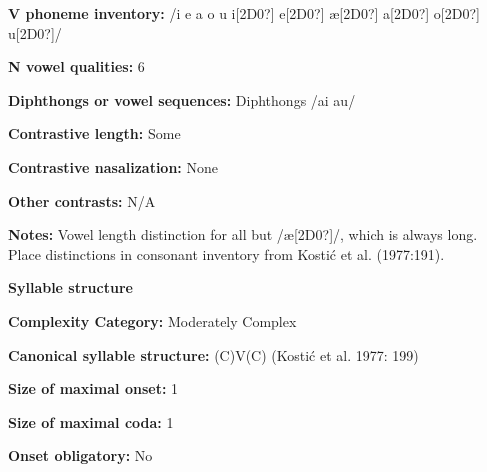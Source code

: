 \begin{styleBody}
\textbf{V phoneme inventory:} /i e a o u i[2D0?] e[2D0?] æ[2D0?] a[2D0?] o[2D0?] u[2D0?]/
\end{styleBody}

\begin{styleBody}
\textbf{N vowel qualities:} 6
\end{styleBody}

\begin{styleBody}
\textbf{Diphthongs or vowel sequences:} Diphthongs /ai au/
\end{styleBody}

\begin{styleBody}
\textbf{Contrastive length:} Some
\end{styleBody}

\begin{styleBody}
\textbf{Contrastive nasalization:} None
\end{styleBody}

\begin{styleBody}
\textbf{Other contrasts:} N/A
\end{styleBody}

\begin{styleBody}
\textbf{Notes:} Vowel length distinction for all but /æ[2D0?]/, which is always long. Place distinctions in consonant inventory from Kostić et al. (1977:191).
\end{styleBody}

\begin{styleBody}
\textbf{Syllable structure}
\end{styleBody}

\begin{styleBody}
\textbf{Complexity Category:} Moderately Complex
\end{styleBody}

\begin{styleBody}
\textbf{Canonical syllable structure:} (C)V(C)\textbf{ }(Kostić et al. 1977: 199)
\end{styleBody}

\begin{styleBody}
\textbf{Size of maximal onset:} 1
\end{styleBody}

\begin{styleBody}
\textbf{Size of maximal coda:} 1
\end{styleBody}

\begin{styleBody}
\textbf{Onset obligatory:} No
\end{styleBody}

